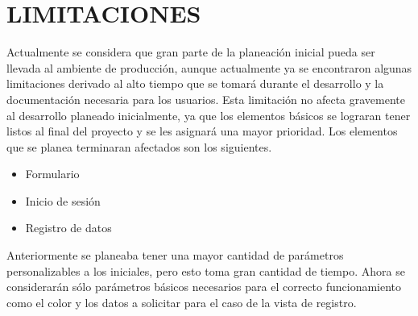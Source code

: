 \section{LIMITACIONES}
Actualmente se considera que gran parte de la planeación inicial pueda ser llevada al ambiente de producción, aunque actualmente ya se encontraron algunas limitaciones derivado al alto tiempo que se tomará durante el desarrollo y la documentación necesaria para los usuarios.
Esta limitación no afecta gravemente al desarrollo planeado inicialmente, ya que los elementos básicos se lograran tener listos al final del proyecto y se les asignará una mayor prioridad.
Los elementos que se planea terminaran afectados son los siguientes. 
\newline
\begin{itemize}
\item  Formulario
\item Inicio de sesión
\item Registro de datos
\end{itemize}
\newline
Anteriormente se planeaba tener una mayor cantidad de parámetros personalizables a los iniciales, pero esto toma gran cantidad de tiempo.
Ahora se considerarán sólo parámetros básicos necesarios para el correcto funcionamiento como el color y los datos a solicitar para el caso de la vista de registro.

  